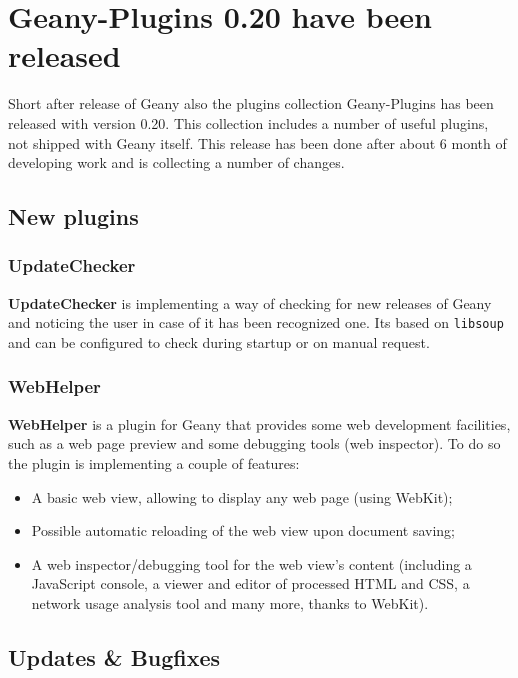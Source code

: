 \documentclass[%
paper=a4,%
fontsize=11pt,%
twoside=false,%
DIV18,
headsepline,
plainheadsepline,
footsepline,
plainfootsepline,
parskip=half,%
openany,%
]{scrartcl}
\begin{document}
\section{Geany-Plugins 0.20 have been released}

Short after release of Geany also the plugins collection
Geany-Plugins has been released with version 0.20. This collection
includes a number of useful plugins, not shipped with Geany itself.
This release has been done after about 6 month of developing work
and is collecting a number of changes.

\subsection{New plugins}
\subsubsection{UpdateChecker}

\textbf{UpdateChecker} is implementing a way of checking for new
releases of Geany and noticing the user in case of it has been
recognized one. Its based on \texttt{libsoup} and can be configured to check
during startup or on manual request.

\subsubsection{WebHelper}

\textbf{WebHelper} is a plugin for Geany that provides some web
development facilities, such as a web page preview and some
debugging tools (web inspector). To do so the plugin is implementing
a couple of features:

\begin{itemize}
	\item A basic web view, allowing to display any web page (using WebKit);
	\item Possible automatic reloading of the web view upon document saving;
	\item A web inspector/debugging tool for the web view's content (including a
		JavaScript console, a viewer and editor of processed HTML and CSS, a network
		usage analysis tool and many more, thanks to WebKit).
\end{itemize}

\subsection{Updates \& Bugfixes}
\end{document}
